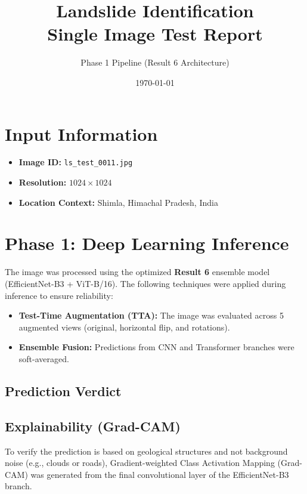 \documentclass[11pt,a4paper]{article}
\title{\vspace{-2cm}\color{primaryblue}\textbf{Landslide Identification}\\ Single Image Test Report}
\author{Phase 1 Pipeline (Result 6 Architecture)}
\date{\today}
\begin{document}
\maketitle

\section*{Input Information}
\begin{itemize}
    \item \textbf{Image ID:} \texttt{ls\_test\_0011.jpg}
    \item \textbf{Resolution:} $1024 \times 1024$
    \item \textbf{Location Context:} Shimla, Himachal Pradesh, India
\end{itemize}

\section*{Phase 1: Deep Learning Inference}
The image was processed using the optimized \textbf{Result 6} ensemble model (EfficientNet-B3 + ViT-B/16). The following techniques were applied during inference to ensure reliability:
\begin{itemize}
    \item \textbf{Test-Time Augmentation (TTA):} The image was evaluated across 5 augmented views (original, horizontal flip, and rotations).
    \item \textbf{Ensemble Fusion:} Predictions from CNN and Transformer branches were soft-averaged.
\end{itemize}

\subsection*{Prediction Verdict}
\vspace{0.3cm}
\noindent{}
\vspace{0.3cm}

\subsection*{Explainability (Grad-CAM)}
To verify the prediction is based on geological structures and not background noise (e.g., clouds or roads), Gradient-weighted Class Activation Mapping (Grad-CAM) was generated from the final convolutional layer of the EfficientNet-B3 branch.
\end{document}
